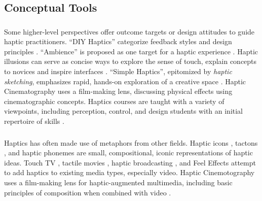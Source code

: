 \subsection{Conceptual Tools}

\subsubsection{}
Some higher-level perspectives offer outcome targets or design attitudes to guide haptic practitioners.
``DIY Haptics'' categorize  feedback styles and design principles \cite{Hayward2007,MacLean2008}.
``Ambience'' is proposed as one target for a haptic experience \cite{MacLean2009}.
Haptic illusions can serve as concise ways to explore the sense of touch, explain concepts to novices and inspire interfaces \cite{Hayward2008}.
``Simple Haptics'', epitomized by \emph{haptic sketching}, emphasizes rapid, hands-on exploration of a creative space \cite{Moussette2010,Moussette2011}. %
Haptic Cinematography \cite{Danieau2014} uses a film-making lens, discussing physical effects using cinematographic concepts.
Haptics courses are taught with a variety of  viewpoints, including perception, control, and design students with an initial repertoire of skills \cite{Okamura2012, Jones2014}.

\subsubsection{}
Haptics has often made use of metaphors from other fields.
Haptic icons  \cite{MacLean2003}, tactons \cite{Brewster2004}, and haptic phonemes \cite{Enriquez2006} are small, compositional, iconic representations of haptic ideas.
Touch TV \cite{Modhrain2001},  tactile movies \cite{Kim2009}, haptic broadcasting \cite{Cha2009}, and Feel Effects \cite{Israr2014} attempt to add haptics to existing media types, especially video.
Haptic Cinemotography \cite{Danieau2013,Danieau2014} uses a film-making lens for haptic-augmented multimedia, including basic principles of composition when combined with video \cite{Guillotel2016}.


